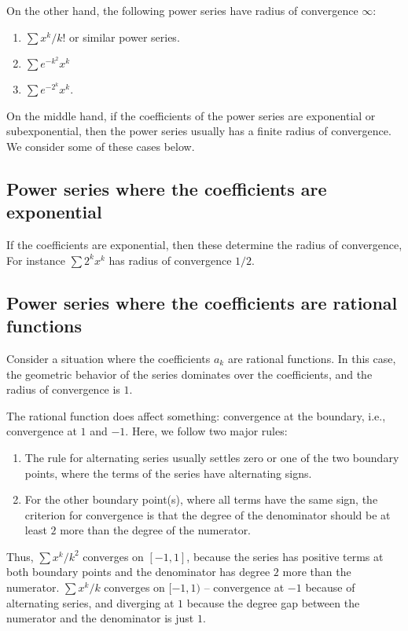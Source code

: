\documentclass{amsart}
\begin{document}
On the other hand, the following power series have radius of
convergence $\infty$:

\begin{enumerate}
\item $\sum x^k/k!$ or similar power series.
\item $\sum e^{-k^2}x^k$
\item $\sum e^{-2^k} x^k$.
\end{enumerate}

On the middle hand, if the coefficients of the power series are
exponential or subexponential, then the power series usually has a
finite radius of convergence. We consider some of these cases below.

\subsection{Power series where the coefficients are exponential}

If the coefficients are exponential, then these determine the radius
of convergence, For instance $\sum 2^kx^k$ has radius of convergence
$1/2$.
\subsection{Power series where the coefficients are rational functions}

Consider a situation where the coefficients $a_k$ are rational
functions. In this case, the geometric behavior of the series
dominates over the coefficients, and the radius of convergence is
$1$.

The rational function does affect something: convergence at the
boundary, i.e., convergence at $1$ and $-1$. Here, we follow two major
rules:

\begin{enumerate}
\item The rule for alternating series usually settles zero or one of
  the two boundary points, where the terms of the series have
  alternating signs.
\item For the other boundary point(s), where all terms have the same
  sign, the criterion for convergence is that the degree of the
  denominator should be at least $2$ more than the degree of the
  numerator.  
\end{enumerate}

Thus, $\sum x^k/k^2$ converges on $[-1,1]$, because the series has
positive terms at both boundary points and the denominator has degree
$2$ more than the numerator. $\sum x^k/k$ converges on $[-1,1)$ --
convergence at $-1$ because of alternating series, and diverging at
$1$ because the degree gap between the numerator and the denominator
is just $1$.
\end{document}
